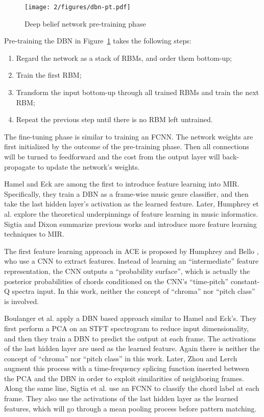 \begin{figure}[htb]
\centering
\texttt{[image: 2/figures/dbn-pt.pdf]}
\caption{Deep belief network pre-training phase}
\label{fig:2-dbn-pt}
\end{figure}
Pre-training the DBN in Figure~\ref{fig:2-dbn-pt} takes the following steps:
\begin{enumerate}
\item Regard the network as a stack of RBMs, and order them bottom-up;
\item Train the first RBM;
\item Transform the input bottom-up through all trained RBMs and train the next RBM;
\item Repeat the previous step until there is no RBM left untrained.
\end{enumerate}
The fine-tuning phase is similar to training an FCNN. The network weights are first initialized by the outcome of the pre-training phase. Then all connections will be turned to feedforward and the cost from the output layer will back-propagate to update the network's weights.

Hamel and Eck \cite{hamel2010learning} are among the first to introduce feature learning into MIR. Specifically, they train a DBN as a frame-wise music genre classifier, and then take the last hidden layer's activation as the learned feature. Later, Humphrey et al. \cite{humphrey2013feature} explore the theoretical underpinnings of feature learning in music informatics. Sigtia and Dixon \cite{sigtia2014improved} summarize previous works and introduce more feature learning techniques to MIR.

The first feature learning approach in ACE is proposed by Humphrey and Bello \cite{humphrey2012rethinking}, who use a CNN to extract features. Instead of learning an ``intermediate'' feature representation, the CNN outputs a ``probability surface'', which is actually the posterior probabilities of chords conditioned on the CNN's ``time-pitch'' constant-Q spectra input. In this work, neither the concept of ``chroma'' nor ``pitch class'' is involved. 

Boulanger et al. \cite{boulanger2013audio} apply a DBN based approach similar to Hamel and Eck's. They first perform a PCA on an STFT spectrogram to reduce input dimensionality, and then they train a DBN to predict the output at each frame. The activations of the last hidden layer are used as the learned feature. Again there is neither the concept of ``chroma'' nor ``pitch class'' in this work. Later, Zhou and Lerch \cite{zhou2015chord} augment this process with a time-frequency splicing function inserted between the PCA and the DBN in order to exploit similarities of neighboring frames. Along the same line, Sigtia et al. \cite{sigtia2015audio} use an FCNN to classify the chord label at each frame. They also use the activations of the last hidden layer as the learned features, which will go through a mean pooling process before pattern matching.

